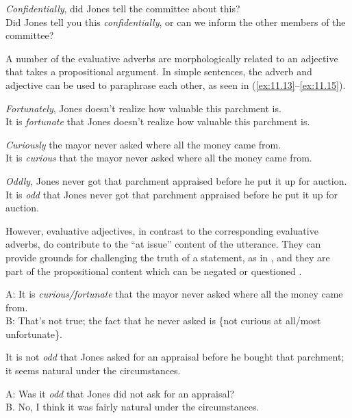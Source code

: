 \ea \label{ex:11.12}
\ea \textit{Confidentially}, did Jones tell the committee about this?\\
\ex Did Jones tell you this \textit{confidentially}, or can we inform the other members   of the committee?
                       \z
\z


A number of the evaluative adverbs are morphologically related to an adjective that takes a propositional argument. In simple sentences, the adverb and adjective can be used to paraphrase each other, as seen in (\ref{ex:11.13}--\ref{ex:11.15}).


\ea \label{ex:11.13}
\ea \textit{Fortunately}, Jones doesn’t realize how valuable this parchment is.\\
\ex It is \textit{fortunate} that Jones doesn’t realize how valuable this parchment is.
                       \z
\z

\ea \label{ex:11.14}
\ea \textit{Curiously} the mayor never asked where all the money came from.\\
\ex It is \textit{curious} that the mayor never asked where all the money came from.
\z \z

\ea \label{ex:11.15}
\ea \textit{Oddly}, Jones never got that parchment appraised before he put it up for auction.\\
\ex It is \textit{odd} that Jones never got that parchment appraised before he put it up for auction.
                       \z
\z


However, evaluative adjectives, in contrast to the corresponding evaluative adverbs, do contribute to the “at issue” content of the utterance. They can provide grounds for challenging the truth of a statement, as in , and they are part of the propositional content which can be negated  or questioned .


\ea \label{ex:11.16}
A: It is \textit{curious/fortunate} that the mayor never asked where all the money came from.\\
B: That’s not true; the fact that he never asked is \{not curious at all/most unfortunate\}.
\z

\ea \label{ex:11.17}
It is not \textit{odd} that Jones asked for an appraisal before he bought that parchment;\\
  it seems natural under the circumstances.
\z

\ea \label{ex:11.18}
A: Was it \textit{odd} that Jones did not ask for an appraisal?\\
B. No, I think it was fairly natural under the circumstances.
\z


